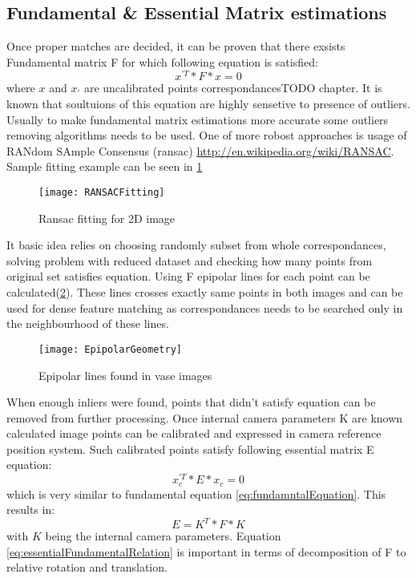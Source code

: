 \subsection{Fundamental \& Essential Matrix estimations}
Once proper matches are decided, it can be proven that there exsists Fundamental matrix F for which following equation is satisfied:
\begin{equation} \label{eq:fundamntalEquation}
{x}^{'T} * F * x = 0
\end{equation} 
where $x$ and ${x}_{'}$ are uncalibrated points correspondances\cite{HartletMultipleView}TODO chapter. It is known that soultuions of this equation are highly sensetive to presence of outliers. Usually to make fundamental matrix estimations more accurate some outliers removing algorithms needs to be used. One of more robost approaches is usage of RANdom SAmple Consensus (\gls{ransac}) \url{http://en.wikipedia.org/wiki/RANSAC}. Sample fitting example can be seen in \ref{fig:RANSACFitting}
\begin{figure}[p]
    \centering
    \texttt{[image: RANSACFitting]}
    \caption{Ransac fitting for 2D image}
    \label{fig:RANSACFitting}
\end{figure}
It basic idea relies on choosing randomly subset from whole correspondances, solving problem with reduced dataset and checking how many points from original set satisfies equation.
Using F epipolar lines for each point can be calculated(\ref{fig:EpipolarGeometry}). These lines crosses exactly same points in both images and can be used for dense feature matching as correspondances needs to be searched only in the neighbourhood of these lines.
\begin{figure}[p]
    \centering
    \texttt{[image: EpipolarGeometry]}
    \caption{Epipolar lines found in vase images}
    \label{fig:EpipolarGeometry}
\end{figure}
When enough inliers were found, points that didn't satisfy equation can be removed from further processing.
Once internal camera parameters K are known calculated image points can be calibrated and expressed in camera reference position system. Such calibrated points satisfy following essential matrix E equation:
\begin{equation} \label{eq:essentialEquation}
{x}_{c}^{'T} * E * x_{c} = 0
\end{equation} 
which is very similar to fundamental equation \ref{eq:fundamntalEquation}. This results in:
\begin{equation} \label{eq:essentialFundamentalRelation}
E = K^{T} * F * K
\end{equation} 
with $K$ being the internal camera parameters. Equation \ref{eq:essentialFundamentalRelation} is important in terms of decomposition of F to relative rotation and translation.
